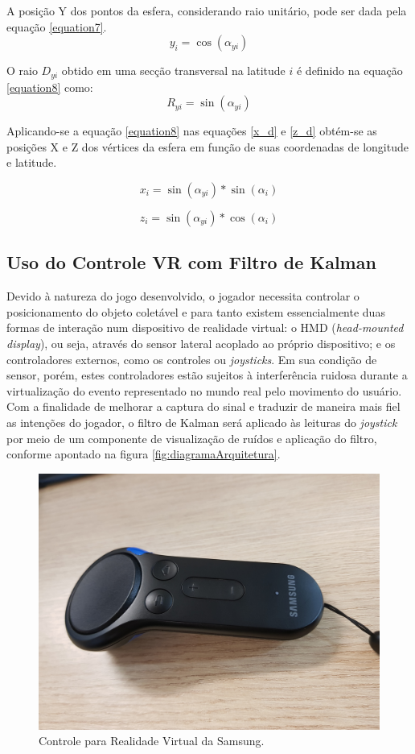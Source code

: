 \documentclass[conference]{IEEEtran}
\begin{document}
A posição Y dos pontos da esfera, considerando raio unitário, pode ser dada pela equação \ref{equation7}.
\begin{equation}
y_{i} = \cos(\alpha_{yi})
\label{equation7}
\end{equation}

O raio $D_{yi}$ obtido em uma secção transversal na latitude $i$ é definido na equação \ref{equation8} como:
\begin{equation}
R_{yi} = \sin(\alpha_{yi})
\label{equation8}
\end{equation}

Aplicando-se a equação \ref{equation8} nas equações \ref{x_d} e \ref{z_d} obtém-se as posições X e Z dos vértices da esfera em função de suas coordenadas de longitude e latitude.

\begin{equation}
x_{i} = \sin(\alpha_{yi}) * \sin(\alpha_i)
\label{equation9}
\end{equation}

\begin{equation}
z_{i} = \sin(\alpha_{yi}) * \cos(\alpha_i)
\label{equation10}
\end{equation}


\subsection{Uso do Controle VR com Filtro de Kalman} \label{sec:gearvrcontroller}
Devido à natureza do jogo desenvolvido, o jogador necessita controlar o posicionamento do objeto coletável e para tanto existem essencialmente duas formas de interação num dispositivo de realidade virtual: o HMD (\textit{head-mounted display}), ou seja, através do sensor lateral acoplado ao próprio dispositivo; e os controladores externos, como os controles ou \textit{joysticks}. Em sua condição de sensor, porém, estes controladores estão sujeitos à interferência ruidosa durante a virtualização do evento representado no mundo real pelo movimento do usuário. Com a finalidade de melhorar a captura do sinal e traduzir de maneira mais fiel as intenções do jogador, o filtro de Kalman será aplicado às leituras do \textit{joystick} por meio de um componente de visualização de ruídos e aplicação do filtro, conforme apontado na figura \ref{fig:diagramaArquitetura}.

\begin{figure}[ht]
\centering
\includegraphics[width=.4\textwidth]{../images/gear_controller.jpg}
\caption{Controle para Realidade Virtual da Samsung.}
\label{fig:vrcontroller}
\end{figure}
\end{document}
